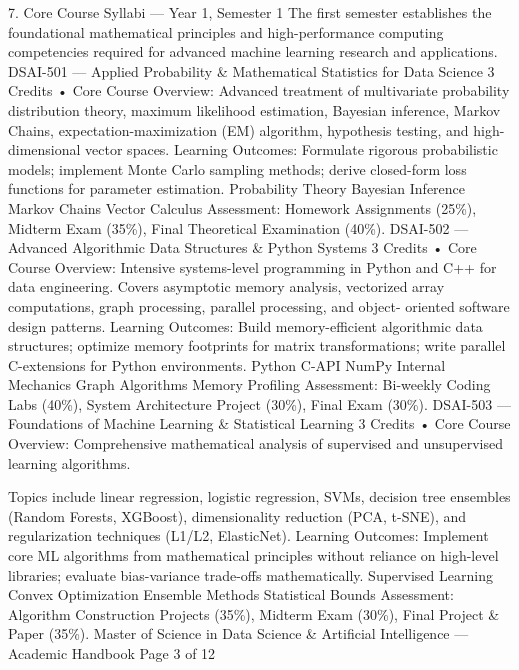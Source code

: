 7. Core Course Syllabi — Year 1, Semester 1
The first semester establishes the foundational mathematical principles and high-performance computing
competencies required for advanced machine learning research and applications.
DSAI-501 — Applied Probability \& Mathematical Statistics for Data Science
3 Credits • Core
Course Overview: Advanced treatment of multivariate probability distribution theory, maximum likelihood
estimation, Bayesian inference, Markov Chains, expectation-maximization (EM) algorithm, hypothesis testing,
and high-dimensional vector spaces.
Learning Outcomes: Formulate rigorous probabilistic models; implement Monte Carlo sampling methods; derive
closed-form loss functions for parameter estimation.
Probability Theory Bayesian Inference Markov Chains Vector Calculus
Assessment: Homework Assignments (25\%), Midterm Exam (35\%), Final Theoretical Examination (40\%).
DSAI-502 — Advanced Algorithmic Data Structures \& Python Systems
3 Credits • Core
Course Overview: Intensive systems-level programming in Python and C++ for data engineering. Covers
asymptotic memory analysis, vectorized array computations, graph processing, parallel processing, and object-
oriented software design patterns.
Learning Outcomes: Build memory-efficient algorithmic data structures; optimize memory footprints for matrix
transformations; write parallel C-extensions for Python environments.
Python C-API NumPy Internal Mechanics Graph Algorithms Memory Profiling
Assessment: Bi-weekly Coding Labs (40\%), System Architecture Project (30\%), Final Exam (30\%).
DSAI-503 — Foundations of Machine Learning \& Statistical Learning
3 Credits • Core
Course Overview: Comprehensive mathematical analysis of supervised and unsupervised learning algorithms.

Topics include linear regression, logistic regression, SVMs, decision tree ensembles (Random Forests, XGBoost),
dimensionality reduction (PCA, t-SNE), and regularization techniques (L1/L2, ElasticNet).
Learning Outcomes: Implement core ML algorithms from mathematical principles without reliance on high-level
libraries; evaluate bias-variance trade-offs mathematically.
Supervised Learning Convex Optimization Ensemble Methods Statistical Bounds
Assessment: Algorithm Construction Projects (35\%), Midterm Exam (30\%), Final Project \& Paper (35\%).
Master of Science in Data Science \& Artificial Intelligence — Academic Handbook
Page 3 of 12

